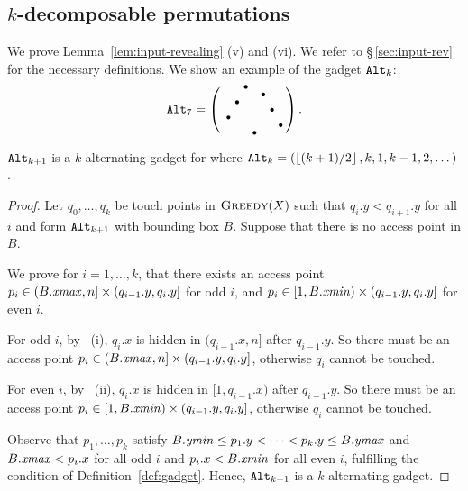 \subsection{$k$-decomposable permutations}
\label{sub:k dec seq}
We prove Lemma~\ref{lem:input-revealing} (v) and (vi). We refer to \S\,\ref{sec:input-rev} for the necessary definitions. We show an example of the gadget $\texttt{Alt}_k$: $$\texttt{Alt}_{7} = \left( \begin{smallmatrix}
  &&&\bullet &&&&\\
  &&&&&\bullet &&\\
  &&\bullet &&&&&\\
  &&&&&&\bullet &\\
  &\bullet &&&&&&\\
  &&&&&&&\bullet \\
  &&&&\bullet &&&\\
 \end{smallmatrix}\right).$$


\begin{lemma}
		$\texttt{Alt}_{k+1}$ is a $k$-alternating gadget for \greedy where $\texttt{Alt}_{k}=(\left\lfloor (k+1)/2\right\rfloor,k,1,k-1,2,\dots)$. 
\end{lemma}

\begin{proof}
 

Let $q_{0},\dots,q_{k}$ be
	touch points in $\textsc{Greedy}(X)$ such that $q_{i}.y<q_{i+1}.y$
	for all $i$ and form $\texttt{Alt}_{k+1}$ with bounding box $B$. 
Suppose that there is no access point in $B$.
	
	
	We prove for $i=1,\dots,k$, that there exists an access point $p_i \in (B.\mathit{xmax},n]\times(q_{i-1}.y,q_{i}.y]$ for odd $i$, and $p_i \in [1,B.\mathit{xmin})\times(q_{i-1}.y,q_{i}.y]$ for even $i$.

For odd $i$, by ~(i), $q_{i}.x$ is hidden in $(q_{i-1}.x,n]$ after $q_{i-1}.y$. So there must be an access point $p_i \in(B.\mathit{xmax},n]\times(q_{i-1}.y,q_{i}.y]$, otherwise $q_i$ cannot be touched.  

For even $i$, by ~(ii), $q_{i}.x$ is hidden in $[1,q_{i-1}.x)$ after $q_{i-1}.y$. 
	So there must be an access point $p_i \in[1,B.\mathit{xmin})\times(q_{i-1}.y,q_{i}.y]$, otherwise $q_i$ cannot be touched.

Observe that $p_{1},\dots,p_{k}$ satisfy $B.\mathit{ymin} \le p_{1}.y<\dots<p_{k}.y\le B.\mathit{ymax}$
		and $B.\mathit{xmax}<p_{i}.x$ for all odd $i$ and $p_{i}.x<B.\mathit{xmin}$ for all
		even $i$, fulfilling the condition of Definition~\ref{def:gadget}. Hence, $\texttt{Alt}_{k+1}$ is a $k$-alternating gadget.

\end{proof}


